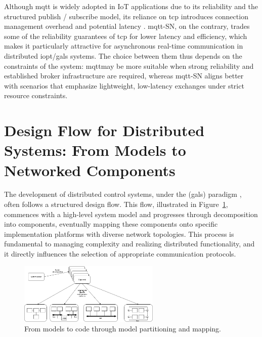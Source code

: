Although \gls{mqtt} is widely adopted in IoT applications due to its reliability and the structured publish / subscribe model, its reliance on \gls{tcp} introduces connection management overhead and potential latency \cite{banks2014mqtt}. \gls{mqtt}-SN, on the contrary, trades some of the reliability guarantees of \gls{tcp} for lower latency and efficiency, which makes it particularly attractive for asynchronous real-time communication in distributed \gls{iopt}/\gls{gals} systems. The choice between them thus depends on the constraints of the system: \gls{mqtt}may be more suitable when strong reliability and established broker infrastructure are required, whereas \gls{mqtt}-SN aligns better with scenarios that emphasize lightweight, low-latency exchanges under strict resource constraints.



 

\section{Design Flow for Distributed Systems: From Models to Networked Components }
\label{sec:design_flow}

The development of distributed control systems, under the (\gls{gals}) paradigm \cite{galsactd, galsborman}, often follows a structured design flow. This flow, illustrated in Figure~\ref{fig:model_to_code_mapping}, commences with a high-level system model and progresses through decomposition into components, eventually mapping these components onto specific implementation platforms with diverse network topologies. This process is fundamental to managing complexity and realizing distributed functionality, and it directly influences the selection of appropriate communication protocols.


\begin{figure}[htbp]
  \centering
 \includegraphics[width=0.6\textwidth]{Chapters/Figures/model_to_code_mapping.png}
  \caption{From models to code through model partitioning and mapping.}
  \label{fig:model_to_code_mapping}
\end{figure}

